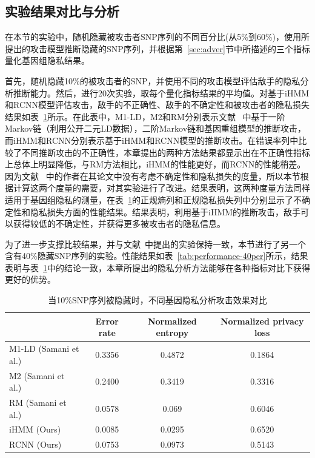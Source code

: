 \subsection{实验结果对比与分析}

在本节的实验中，随机隐藏被攻击者SNP序列的不同百分比(从5\%到60\%)，使用所提出的攻击模型推断隐藏的SNP序列，并根据第~\ref{sec:adver}节中所描述的三个指标量化基因组隐私结果。

首先，随机隐藏10\%的被攻击者的SNP，并使用不同的攻击模型评估敌手的隐私分析推断能力。然后，进行20次实验，取每个量化指标结果的平均值。对基于iHMM和RCNN模型评估攻击，敌手的不正确性、敌手的不确定性和被攻击者的隐私损失结果如表~\ref{tab:performance-10per}所示。在此表中，M1-LD，M2和RM分别表示文献~\cite{samani2015quantifying} 中基于一阶Markov链（利用公开二元LD数据），二阶Markov链和基因重组模型的推断攻击，而iHMM和RCNN分别表示基于iHMM和RCNN模型的推断攻击。在错误率列中比较了不同推断攻击的不正确性，本章提出的两种方法结果都显示出在不正确性指标上总体上明显降低，与RM方法相比，iHMM的性能更好，而RCNN的性能稍差。因为文献~\cite{samani2015quantifying} 中的作者在其论文中没有考虑不确定性和隐私损失的度量，所以本节根据计算这两个度量的需要，对其实验进行了改进。结果表明，这两种度量方法同样适用于基因组隐私的测量，在表~\ref{tab:performance-10per}的正规熵列和正规隐私损失列中分别显示了不确定性和隐私损失方面的性能结果。结果表明，利用基于iHMM的推断攻击，敌手可以获得较低的不确定性，并获得更多被攻击者的隐私信息。

为了进一步支撑比较结果，并与文献~\cite{samani2015quantifying}中提出的实验保持一致，本节进行了另一个含有40\%隐藏SNP序列的实验。性能结果如表~\ref{tab:performance-40per}所示，结果表明与表~\ref{tab:performance-10per}中的结论一致，本章所提出的隐私分析方法能够在各种指标对比下获得更好的优势。

\begin{table}[htbp]
	\caption{当10\%SNP序列被隐藏时，不同基因隐私分析攻击效果对比}
	\label{tab:performance-10per}
	\begin{tabular}{lccc}
		\hline
		& Error rate & Normalized entropy & Normalized privacy loss\\
		\hline
		M1-LD (Samani et al.) & 0.3356  & 0.4872 & 0.1864 \\
		M2 (Samani et al.)    & 0.2400  & 0.3419 & 0.3316\\
		RM (Samani et al.)    &  0.0578 & 0.069 & 0.6046 \\
		iHMM (Ours)          & 0.0085  &0.0295 & 0.6520 \\
		RCNN (Ours)          & 0.0753  &0.0973 & 0.5143\\
		\hline
	\end{tabular}
\end{table}


